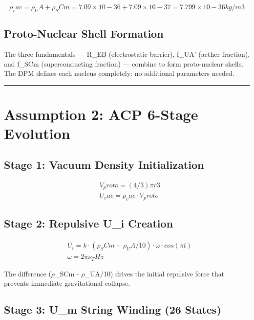 \documentclass[12pt,a4paper]{article}
\begin{document}
\begin{equation}
\rho_vac = \rho_UA + \rho_SCm = 7.09\times10-36 + 7.09\times10-37 = 7.799\times10-36 kg/m3
\end{equation}

\subsection{Proto-Nuclear Shell Formation}

The three fundamentals --- R\_EB (electrostatic barrier), f\_UA' (aether fraction), and f\_SCm (superconducting fraction) --- combine to form proto-nuclear shells. The DPM defines each nucleus completely: no additional parameters needed.

\medskip\hrule\medskip

\section{Assumption 2: ACP 6-Stage Evolution}

\subsection{Stage 1: Vacuum Density Initialization}

\begin{equation}
\begin{aligned}
  & V_proto = (4/3)\pi r3 \\
  & U_vac = \rho_vac \cdot V_proto
\end{aligned}
\end{equation}

\subsection{Stage 2: Repulsive U\_i Creation}

\begin{equation}
\begin{aligned}
  & U_i = k \cdot (\rho_SCm - \rho_UA/10) \cdot \omega \cdot cos(\pi t) \\
  & \omega = 2\pi\nu_THz
\end{aligned}
\end{equation}

The difference ($\rho$\_SCm - $\rho$\_UA/10) drives the initial repulsive force that prevents immediate gravitational collapse.

\subsection{Stage 3: U\_m String Winding (26 States)}
\end{document}
